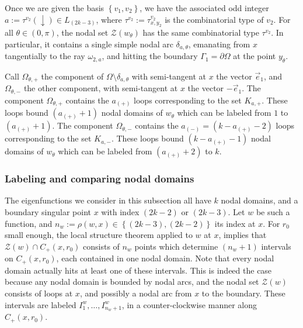 \documentclass[12pt,a4paper]{amsart}
\theoremstyle{plain} %
\theoremstyle{definition}
\numberwithin{equation}{section}
\numberwithin{figure}{section}
\numberwithin{table}{section}
\newcommand{\cZ}{\mathcal{Z}}
\newcommand{\sm}{\!\setminus\!}
\newcommand{\set}[1]{\left\lbrace #1 \right\rbrace}
\begin{document}
{Once we are given the basis $ \set{v_1,v_2}$, we have the associated odd integer  $a := \tau^{v_2}(\downarrow) \in L_{(2k-3)}$, where $\tau^{v_2} := \tau_{x,y_2}^{v_2}$ is the combinatorial type of $v_2$. For all $\theta \in (0,\pi)$, the nodal set $\cZ(w_{\theta})$ has the same combinatorial type $\tau^{v_2}$. In particular, it contains a single simple nodal arc $\delta_{a,\theta}$, emanating from $x$ tangentially to the ray $\omega_{2,a}$, and hitting the boundary $\Gamma_1 = \partial \Omega$ at the point $y_{\theta}$. \smallskip

Call $\Omega_{\theta,+}$ the component of $\Omega \sm \delta_{a,\theta}$ with semi-tangent at $x$ the vector $\vec{e}_1$, and  $\Omega_{\theta,-}$ the other component, with semi-tangent at $x$ the vector $-\vec{e}_1$. The component $\Omega_{\theta,+}$ contains the $a_{(+)}$ loops corresponding to the set $K_{a,+}$. These loops bound $(a_{(+)}+1)$ nodal domains of $w_{\theta}$ which can be labeled from $1$ to $(a_{(+)}+1)$. The component $\Omega_{\theta,-}$ contains the $a_{(-)} = (k - a_{(+)} -2)$ loops corresponding to the set $K_{a,-}$. These loops bound $(k - a_{(+)} -1)$ nodal domains of $w_{\theta}$ which can be labeled from $(a_{(+)}+2)$ to $k$.\smallskip


\subsubsection{Labeling and comparing nodal domains}\label{SSS-hmn-25C}\phantom{}

 The eigenfunctions we consider in this subsection all have $k$ nodal domains, and a boundary singular point $x$ with index $(2k-2)$ or $(2k-3)$. Let $w$ be such a function, and $n_w := \rho(w,x) \in \set{(2k-3),(2k-2)}$ its index at $x$. For $r_0$ small enough, the local structure theorem applied to $w$ at $x$, implies that $\cZ(w) \cap C_{+}(x,r_0)$ consists of $n_w$ points which determine  $(n_w+1)$ intervals on $C_{+}(x,r_0)$, each contained in one nodal domain.  Note that every nodal domain actually hits at least one of these intervals. This is indeed the case because  any nodal domain is bounded by nodal arcs, and the nodal set $\cZ(w)$ consists of loops at $x$, and possibly a nodal arc from $x$ to the boundary. These intervals are labeled $I^w_1, \ldots , I^w_{n_w+1}$, in a counter-clockwise manner along $C_{+}(x,r_0)$.
\smallskip

}
\end{document}
